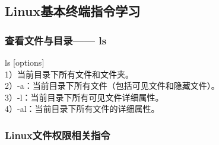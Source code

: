 \documentclass[12pt]{article}
\begin{document}
\subsection{Linux基本终端指令学习}
\subsubsection{查看文件与目录——{} ls}
\begin{flushleft}
ls [options]\\
1）当前目录下所有文件和文件夹。\\
2）-a：当前目录下所有文件（包括可见文件和隐藏文件）。\\
3）-l：当前目录下所有可见文件详细属性。\\
4）-al：当前目录下所有文件的详细属性。
\end{flushleft}
\subsubsection{Linux文件权限相关指令}
\end{document}
